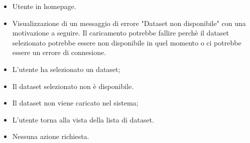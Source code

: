 \newpage

    \UCdsc
    { %
        \begin{itemize}
            \item Utente in homepage.
        \end{itemize}
    }
    { %
        \begin{itemize}
            \item  Visualizzazione di un messaggio di errore "Dataset non disponibile" con una motivazione a seguire.
                    Il caricamento potrebbe fallire perchè il dataset selezionato potrebbe essere
                    non disponibile in quel momento o ci potrebbe essere un errore di connesione.
        \end{itemize}
    }
    { %
        \begin{itemize}
            \item L'utente ha selezionato un dataset;
            \item Il dataset selezionato non è disponibile.
        \end{itemize}
    }
    { %
        \begin{itemize}
            \item Il dataset non viene caricato nel sistema;
            \item L'utente torna alla vista della lista di dataset.
        \end{itemize}
    }
    { %
        \begin{itemize}
            \item Nessuna azione richiesta.
        \end{itemize}
    }



